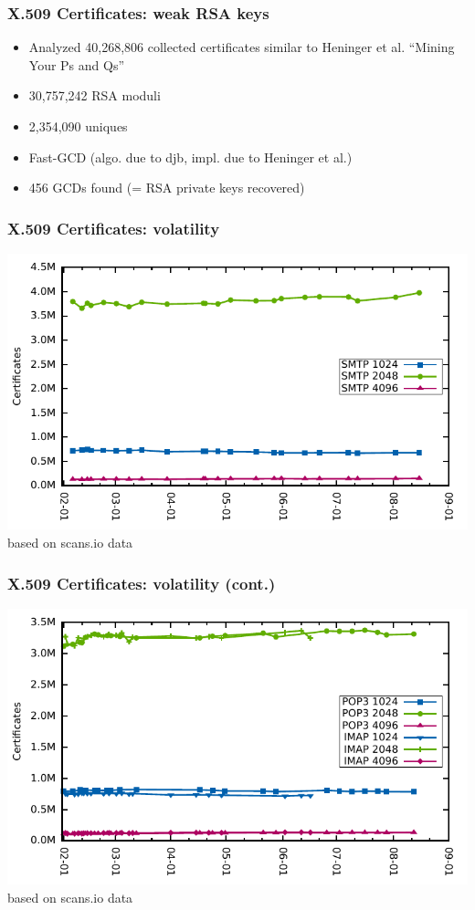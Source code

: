 \documentclass[14pt,aspectratio=43]{beamer}
\begin{document}
\begin{frame}
  \frametitle{X.509 Certificates: weak RSA keys}
  \begin{center}
  \begin{itemize}
    \item Analyzed 40,268,806 collected certificates similar to Heninger et al. ``Mining Your Ps and Qs''
    \item 30,757,242 RSA moduli
    \item 2,354,090 uniques
    \item Fast-GCD (algo. due to djb, impl. due to Heninger et al.)
    \item 456 GCDs found (= RSA private keys recovered)
  \end{itemize}
  \end{center}
\end{frame}


\begin{frame}
  \frametitle{X.509 Certificates: volatility}
  \begin{center}
    \includegraphics*[scale=0.8]{images/smtp_volatility.pdf}\\
  \tiny{based on scans.io data}
  \end{center}
\end{frame}


\begin{frame}
  \frametitle{X.509 Certificates: volatility (cont.)}
  \begin{center}
    \includegraphics*[scale=0.8]{images/mua_volatility.pdf}\\
  \tiny{based on scans.io data}
  \end{center}
\end{frame}
\end{document}
